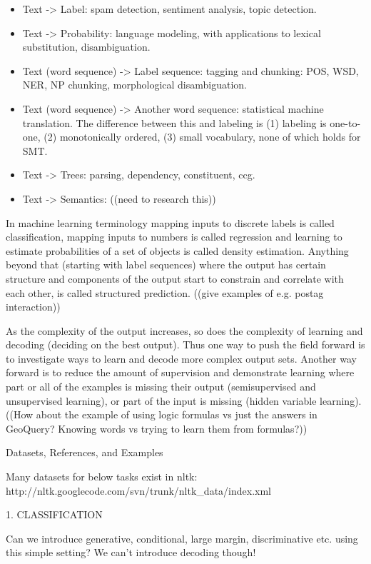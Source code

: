 \begin{itemize}
\item Text -> Label: spam detection, sentiment analysis, topic
  detection.
\item Text -> Probability: language modeling, with applications to
  lexical substitution, disambiguation.
\item Text (word sequence) -> Label sequence: tagging and chunking:
  POS, WSD, NER, NP chunking, morphological disambiguation.
\item Text (word sequence) -> Another word sequence: statistical
  machine translation.  The difference between this and labeling is
  (1) labeling is one-to-one, (2) monotonically ordered, (3) small
  vocabulary, none of which holds for SMT.
\item Text -> Trees: parsing, dependency, constituent, ccg.
\item Text -> Semantics: ((need to research this))
\end{itemize}

In machine learning terminology mapping inputs to discrete labels is
called classification, mapping inputs to numbers is called regression
and learning to estimate probabilities of a set of objects is called
density estimation.  Anything beyond that (starting with label
sequences) where the output has certain structure and components of
the output start to constrain and correlate with each other, is called
structured prediction.  ((give examples of e.g. postag interaction))

As the complexity of the output increases, so does the complexity of
learning and decoding (deciding on the best output).  Thus one way to
push the field forward is to investigate ways to learn and decode more
complex output sets.  Another way forward is to reduce the amount of
supervision and demonstrate learning where part or all of the examples
is missing their output (semisupervised and unsupervised learning), or
part of the input is missing (hidden variable learning).  ((How about
the example of using logic formulas vs just the answers in GeoQuery?
Knowing words vs trying to learn them from formulas?))


Datasets, References, and Examples

Many datasets for below tasks exist in nltk:
http://nltk.googlecode.com/svn/trunk/nltk_data/index.xml

1. CLASSIFICATION

Can we introduce generative, conditional, large margin, discriminative
etc. using this simple setting?  We can't introduce decoding though!

